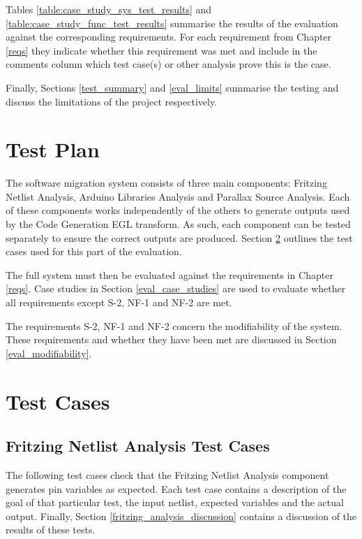 \documentclass{UoYCSproject}
\begin{document}
Tables \ref{table:case_study_sys_test_results} and \ref{table:case_study_func_test_results} summarise the results of the evaluation against the corresponding requirements. For each requirement from Chapter \ref{reqs} they indicate whether this requirement was met and include in the comments column which test case(s) or other analysis prove this is the case.

Finally, Sections \ref{test_summary} and \ref{eval_limits} summarise the testing and discuss the limitations of the project respectively.

\section{Test Plan} \label{test_plan}
The software migration system consists of three main components: Fritzing Netlist Analysis, Arduino Libraries Analysis and Parallax Source Analysis. Each of these components works independently of the others to generate outputs used by the Code Generation EGL transform. As such, each component can be tested separately to ensure the correct outputs are produced. Section \ref{test_cases} outlines the test cases used for this part of the evaluation.

The full system must then be evaluated against the requirements in Chapter \ref{reqs}. Case studies in Section \ref{eval_case_studies} are used to evaluate whether all requirements except S-2, NF-1 and NF-2 are met.

The requirements S-2, NF-1 and NF-2 concern the modifiability of the system. These requirements and whether they have been met are discussed in Section \ref{eval_modifiability}.
	
\section{Test Cases} \label{test_cases}
	
\subsection{Fritzing Netlist Analysis Test Cases}
The following test cases check that the Fritzing Netlist Analysis component generates pin variables as expected. Each test case contains a description of the goal of that particular test, the input netlist, expected variables and the actual output. Finally, Section \ref{fritzing_analysis_discussion} contains a discussion of the results of these tests.
\end{document}
